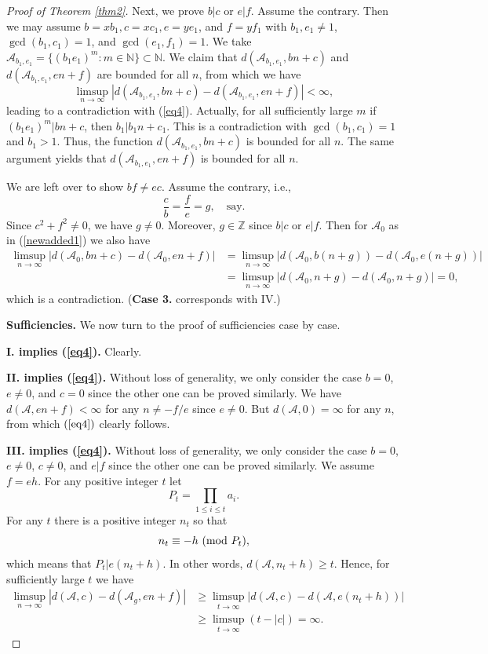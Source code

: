 \documentclass[12pt,a4paper,reqno]{amsart}
\numberwithin{equation}{section}
\def\pmod #1{\ ({\rm{mod}}\ #1)}
\theoremstyle{plain}
\theoremstyle{definition}
\begin{document}
\begin{proof}[Proof of Theorem \ref{thm2}]
Next, we prove $b|c$ or $e|f$. Assume the contrary. Then we may assume $b=xb_1, c=xc_1, e=ye_1$, and $f=yf_1$ with $b_1,e_1\neq 1$, $\gcd(b_1,c_1)=1$, and $\gcd(e_1,f_1)=1$. We take $\mathcal{A}_{b_1,e_1}=\{(b_1e_1)^m: m\in \mathbb{N}\}\subset \mathbb{N}$. We claim that $d(\mathcal{A}_{b_1,e_1},bn+c)$ and $d(\mathcal{A}_{b_1,e_1},en+f)$ are bounded for all $n$, from which we have
$$
\limsup_{n\rightarrow\infty}|d(\mathcal{A}_{b_1,e_1},bn+c)-d(\mathcal{A}_{b_1,e_1},en+f)|<\infty,
$$
leading to a contradiction with (\ref{eq4}). Actually, for all sufficiently large $m$ if $(b_1e_1)^m|bn+c$, then $b_1|b_1n+c_1$. This is a contradiction with $\gcd(b_1,c_1)=1$ and $b_1>1$. Thus, the function $d(\mathcal{A}_{b_1,e_1},bn+c)$ is bounded for all $n$. The same argument yields that $d(\mathcal{A}_{b_1,e_1},en+f)$ is bounded for all $n$.

We are left over to show $bf\neq ec$. Assume the contrary, i.e., 
$$
\frac{c}{b}=\frac{f}{e}=g,\quad \text{say.}
$$
Since $c^2+f^2\neq 0$, we have $g\neq 0$. Moreover, $g\in \mathbb{Z}$ since $b|c$ or $e|f$. Then for $\mathcal{A}_0$ as in (\ref{newadded1}) we also have
\begin{align*}
\limsup_{n\rightarrow\infty}|d(\mathcal{A}_0,bn+c)-d(\mathcal{A}_0,en+f)|&=\limsup_{n\rightarrow\infty}|d(\mathcal{A}_0,b(n+g))-d(\mathcal{A}_0,e(n+g))|\\
&=\limsup_{n\rightarrow\infty}|d(\mathcal{A}_0,n+g)-d(\mathcal{A}_0,n+g)|=0,
\end{align*} 
which is a contradiction. 
({\bf Case 3.} corresponds with IV.)

{\bf Sufficiencies.} We now turn to the proof of sufficiencies case by case. 

{\bf I. implies (\ref{eq4}).} Clearly.

{\bf II. implies (\ref{eq4}).} Without loss of generality, we only consider the case $b=0$, $e\neq 0$, and $c=0$ since the other one can be proved similarly. We have $d(\mathcal{A},en+f)<\infty$ for any $n\neq -f/e$ since $e\neq 0$. But $d(\mathcal{A},0)=\infty$ for any $n$, from which $(\ref{eq4})$ clearly follows.

{\bf III. implies (\ref{eq4}).} Without loss of generality, we only consider the case $b=0$, $e\neq 0$, $c\neq 0$, and $e|f$ since the other one can be proved similarly. We assume $f=eh$. For any positive integer $t$ let
$$
P_t=\prod_{1\le i\le t}a_i.
$$
For any $t$ there is a positive integer $n_t$ so that
$$
n_t\equiv -h\pmod {P_{t}},
$$
which means that 
$
P_t|e(n_t+h).
$
In other words, $d(\mathcal{A},n_t+h)\ge t$.
Hence, for sufficiently large $t$ we have 
\begin{align*}
\limsup_{n\rightarrow\infty}|d(\mathcal{A},c)-d(\mathcal{A}_g,en+f)|&\ge\limsup_{t\rightarrow\infty}|d(\mathcal{A},c)-d(\mathcal{A},e(n_t+h))|\\
&\ge \limsup_{t\rightarrow\infty}(t-|c|)=\infty.
\end{align*} 


\end{proof}
\end{document}
